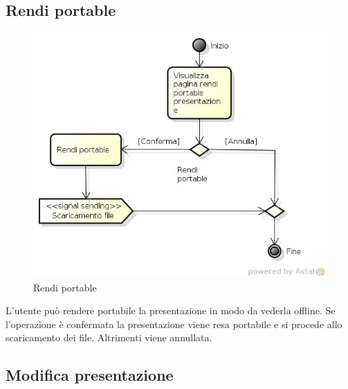 \subsection{Rendi portable}

\begin{figure}[h!]
		\centering
		\includegraphics[scale=.2]{img/Rendi_portable.jpg}
		\caption{Rendi portable}
		\label{fig:ModelloSpy}
\end{figure}

L'utente può rendere portabile la presentazione in modo da vederla offline. Se l'operazione è confermata la presentazione viene resa portabile e si procede allo scaricamento dei file. Altrimenti viene annullata.

\subsection{Modifica presentazione}

